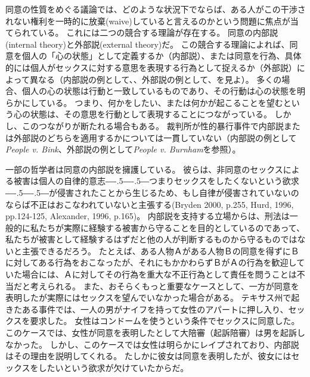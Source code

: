 \documentclass[paper=a4,book,openany]{jlreq}
\def\DDASH{―\kern-.5\zw―\kern-.5\zw―} %
\begin{document}
同意の性質をめぐる議論では、どのような状況下でならば、ある人がこの干渉されない権利を一時的に放棄(waive)していると言えるのかという問題に焦点が当てられている。
これには二つの競合する理論が存在する。
同意の内部説(internal theory)と外部説(external theory)だ。
この競合する理論によれば、同意を個人の「心の状態」として定義するか（内部説）、または同意を行為、具体的には個人がセックスに対する意思を表現する行為として捉えるか（外部説）によって異なる（内部説の例として\citet[pp. 124--125]{hurd96:_moral_magic_consen}、\citet[pp.166--167]{alexander96:_moral_magic_consen_ii}、外部説の例として\citet[p.69]{brett98:_sexual_offen_consen}、\citet[p.422]{schulhofer05:_rape_twilig_zone}を見よ）。
多くの場合、個人の心の状態は行動と一致しているものであり、その行動は心の状態を明らかにしている。
つまり、何かをしたい、または何かが起こることを望むという心の状態は、その意思を行動として表現することにつながっている。
しかし、このつながりが断たれる場合もある。
裁判所が性的暴行事件で内部説または外部説のどちらを適用するかについては一貫していない（内部説の例として\emph{People v. Bink}、外部説の例として\emph{People v. Burnham}を参照）。

一部の哲学者は同意の内部説を擁護している。
彼らは、非同意のセックスによる被害は個人の自律的意志{\DDASH}つまりセックスをしたくないという欲求{\DDASH}が侵害されたことから生じるため、もし自律が侵害されていないのならば不正はおこなわれていないと主張する(Bryden 2000, p.255, Hurd, 1996, pp.124-125, Alexander, 1996, p.165)。
\nocite{bryden00:_redef_rape}\nocite{hurd96:_moral_magic_consen}\nocite{alexander96:_moral_magic_consen_ii}
内部説を支持する立場からは、刑法は一般的に私たちが実際に経験する被害から守ることを目的としているのであって、私たちが被害として経験するはずだと他の人が判断するものから守るものではないと主張できるだろう。
たとえば、ある人物Ａがある人物Ｂの同意を得ずにＢに対してある行為をおこなったが、それにもかかわらずＢがＡの行為を歓迎していた場合には、Ａに対してその行為を重大な不正行為として責任を問うことは不当だと考えられる。
また、おそらくもっと重要なケースとして、一方が同意を表明したが実際にはセックスを望んでいなかった場合がある。
テキサス州で起きたある事件では、一人の男がナイフを持って女性のアパートに押し入り、セックスを要求した。
女性はコンドームを使うという条件でセックスに同意した。
このケースでは、女性が同意を表明したとして大陪審（起訴陪審）は男を起訴しなかった。
しかし、このケースでは女性は明らかにレイプされており、内部説はその理由を説明してくれる。
たしかに彼女は同意を表明したが、彼女にはセックスをしたいという欲求が欠けていたからだ\citep[cf.][p.137]{hurd96:_moral_magic_consen}。
\end{document}
